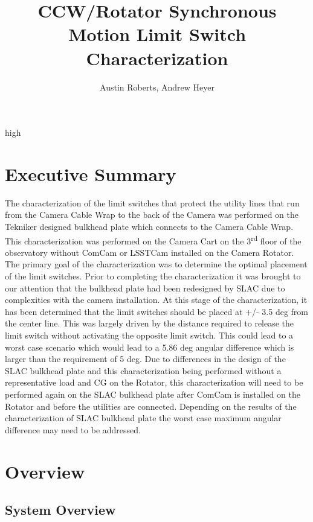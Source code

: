 high\documentclass[SE,lsstdraft,authoryear,toc]{lsstdoc}
\title{CCW/Rotator Synchronous Motion Limit Switch Characterization}
\author{%
Austin Roberts, Andrew Heyer
}
\date{\vcsDate}
\begin{document}
\maketitle


\section{Executive Summary}

The characterization of the limit switches that protect the utility
lines that run from the Camera Cable Wrap to the back of the Camera was
performed on the Tekniker designed bulkhead plate which connects to the
Camera Cable Wrap. This characterization was performed on the Camera
Cart on the 3\textsuperscript{rd} floor of the observatory without
ComCam or LSSTCam installed on the Camera Rotator. The primary goal of
the characterization was to determine the optimal placement of the limit
switches. Prior to completing the characterization it was brought to our
attention that the bulkhead plate had been redesigned by SLAC due to
complexities with the camera installation. At this stage of the
characterization, it has been determined that the limit switches should
be placed at +/- 3.5 deg from the center line. This was largely driven
by the distance required to release the limit switch without activating
the opposite limit switch. This could lead to a worst case scenario
which would lead to a 5.86 deg angular difference which is larger than
the requirement of 5 deg. Due to differences in the design of the SLAC
bulkhead plate and this characterization being performed without a
representative load and CG on the Rotator, this characterization will
need to be performed again on the SLAC bulkhead plate after ComCam is
installed on the Rotator and before the utilities are connected.
Depending on the results of the characterization of SLAC bulkhead plate
the worst case maximum angular difference may need to be addressed.

\section{Overview}

\subsection{System Overview}
\end{document}
